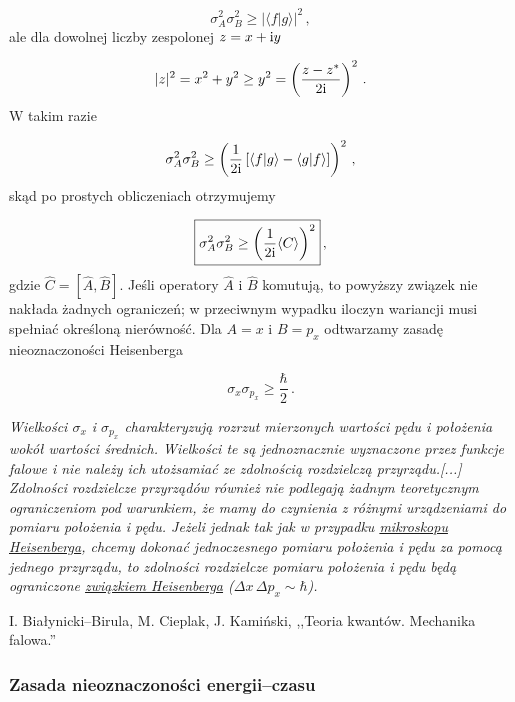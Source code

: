 \documentclass{myclass}
\begin{document}
\begin{equation*}
\sigma_A^2\sigma_B^2\geq |\langle f | g\rangle|^2\,,
\end{equation*}
ale dla dowolnej liczby zespolonej \(z=x+\mathrm{i} y\)

\begin{equation*}
|z|^2=x^2+y^2\geq y^2=\left(\frac{z-z^*}{2\mathrm{i}}\right)^2\,.
\end{equation*}
W takim razie

\begin{equation*}
\sigma_A^2\sigma_B^2\geq \left(\frac{1}{2\mathrm{i}}\left[\langle f | g\rangle-\langle g | f\rangle \right]\right)^2\,,
\end{equation*}
skąd po prostych obliczeniach otrzymujemy

\begin{equation*}
\boxed{\sigma_A^2\sigma_B^2\geq\left(\frac{1}{2\mathrm{i}}\langle C \rangle\right)^2}\,,
\end{equation*}
gdzie \(\boxed{\hat{C}=[\hat{A},\hat{B}]}\). Jeśli operatory \(\hat{A}\) i \(\hat{B}\) komutują, to
powyższy związek nie nakłada żadnych ograniczeń; w przeciwnym wypadku iloczyn wariancji musi
spełniać określoną nierówność. Dla \(A=x\) i \(B=p_x\) odtwarzamy zasadę nieoznaczoności Heisenberga

\begin{equation*}
\sigma_{x}\sigma_{p_x}\geq \frac{\hbar}{2}\,.
\end{equation*}

\textit{Wielkości \(\sigma_x\) i \(\sigma_{p_x}\) charakteryzują rozrzut mierzonych wartości pędu i
położenia wokół wartości średnich. Wielkości te są jednoznacznie wyznaczone przez funkcje falowe i
nie należy ich utożsamiać ze zdolnością rozdzielczą przyrządu.[...] Zdolności rozdzielcze przyrządów
również nie podlegają żadnym teoretycznym ograniczeniom  pod warunkiem, że mamy do czynienia z
różnymi urządzeniami do pomiaru położenia i pędu. Jeżeli jednak tak jak w przypadku
\href{https://en.wikipedia.org/wiki/Heisenberg\%27s_microscope}{mikroskopu Heisenberga}, chcemy
dokonać jednoczesnego pomiaru położenia i pędu za pomocą jednego przyrządu, to zdolności rozdzielcze
pomiaru położenia i pędu będą ograniczone \underline{związkiem Heisenberga} (\(\Delta x\,\Delta
p_x\sim\hbar\)).}\begin{flushright}I. Białynicki--Birula, M. Cieplak, J. Kamiński, ,,Teoria kwantów.
Mechanika falowa.''\end{flushright}

\subsubsection{Zasada nieoznaczoności energii--czasu}
\end{document}
